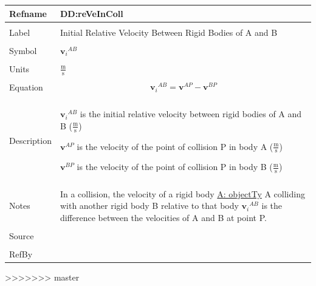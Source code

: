 \documentclass[12pt]{article}
\begin{document}
\noindent \begin{minipage}{\textwidth}
\begin{tabular}{p{} p{}}
\toprule \textbf{Refname} & \textbf{DD:reVeInColl}
\label{DD:reVeInColl}
\\ \midrule \\
Label & Initial Relative Velocity Between Rigid Bodies of A and B
        \\ \midrule \\
        Symbol & ${{\mathbf{v}_{i}}^{AB}}$
                 \\ \midrule \\
                 Units & $\frac{\text{m}}{\text{s}}$
                         \\ \midrule \\
                         Equation & \begin{displaymath}
                                    {{\mathbf{v}_{i}}^{AB}}={\mathbf{v}^{AP}}-{\mathbf{v}^{BP}}
                                    \end{displaymath}
                                    \\ \midrule \\
                                    Description & \begin{symbDescription}
                                                  \item{${{\mathbf{v}_{i}}^{AB}}$ is the initial relative velocity between rigid bodies of A and B ($\frac{\text{m}}{\text{s}}$)}
                                                  \item{${\mathbf{v}^{AP}}$ is the velocity of the point of collision P in body A ($\frac{\text{m}}{\text{s}}$)}
                                                  \item{${\mathbf{v}^{BP}}$ is the velocity of the point of collision P in body B ($\frac{\text{m}}{\text{s}}$)}
                                                  \end{symbDescription}
                                                  \\ \midrule \\
                                                  Notes & In a collision, the velocity of a rigid body \hyperref[assumpOT]{A: objectTy} A colliding with another rigid body B relative to that body ${{\mathbf{v}_{i}}^{AB}}$ is the difference between the velocities of A and B at point P.
                                                          \\ \midrule \\
                                                          Source & \\ \midrule \\
                                                                   RefBy & 
\\ \bottomrule \end{tabular}
\end{minipage}
>>>>>>> master
\end{document}
